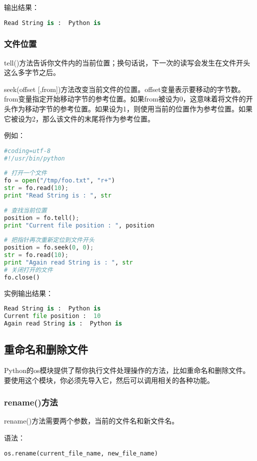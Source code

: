输出结果：
 \begin{lstlisting}[language=Python]
Read String is :  Python is
  \end{lstlisting}



\subsubsection{文件位置}
tell()方法告诉你文件内的当前位置；换句话说，下一次的读写会发生在文件开头这么多字节之后。

seek(offset [,from])方法改变当前文件的位置。offset变量表示要移动的字节数。from变量指定开始移动字节的参考位置。如果from被设为0，这意味着将文件的开头作为移动字节的参考位置。如果设为1，则使用当前的位置作为参考位置。如果它被设为2，那么该文件的末尾将作为参考位置。

例如：
 \begin{lstlisting}[language=Python]
#coding=utf-8
#!/usr/bin/python
 
# 打开一个文件
fo = open("/tmp/foo.txt", "r+")
str = fo.read(10);
print "Read String is : ", str
 
# 查找当前位置
position = fo.tell();
print "Current file position : ", position
 
# 把指针再次重新定位到文件开头
position = fo.seek(0, 0);
str = fo.read(10);
print "Again read String is : ", str
# 关闭打开的文件
fo.close()
  \end{lstlisting}
实例输出结果：
 \begin{lstlisting}[language=Python]
Read String is :  Python is
Current file position :  10
Again read String is :  Python is
  \end{lstlisting}



\subsection{重命名和删除文件}
Python的os模块提供了帮你执行文件处理操作的方法，比如重命名和删除文件。
要使用这个模块，你必须先导入它，然后可以调用相关的各种功能。



\subsubsection{rename()方法}
rename()方法需要两个参数，当前的文件名和新文件名。

语法：
 \begin{lstlisting}[language=Python]
os.rename(current_file_name, new_file_name)
  \end{lstlisting}

